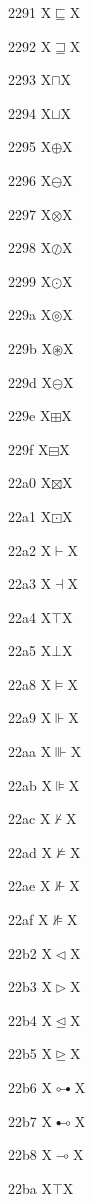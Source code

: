 \documentclass[11pt]{article}
\begin{document}
2291 X{\ensuremath{\sqsubseteq}}X

2292 X{\ensuremath{\sqsupseteq}}X

2293 X{\ensuremath{\sqcap}}X

2294 X{\ensuremath{\sqcup}}X

2295 X{\ensuremath{\oplus}}X

2296 X{\ensuremath{\ominus}}X

2297 X{\ensuremath{\otimes}}X

2298 X{\ensuremath{\oslash}}X

2299 X{\ensuremath{\odot}}X

229a X{\ensuremath{\circledcirc}}X

229b X{\ensuremath{\circledast}}X

229d X{\ensuremath{\circleddash}}X

229e X{\ensuremath{\boxplus}}X

229f X{\ensuremath{\boxminus}}X

22a0 X{\ensuremath{\boxtimes}}X

22a1 X{\ensuremath{\boxdot}}X

22a2 X{\ensuremath{\vdash}}X

22a3 X{\ensuremath{\dashv}}X

22a4 X{\ensuremath{\top}}X

22a5 X{\ensuremath{\bot}}X

22a8 X{\ensuremath{\vDash}}X

22a9 X{\ensuremath{\Vdash}}X

22aa X{\ensuremath{\Vvdash}}X

22ab X{\ensuremath{\VDash}}X

22ac X{\ensuremath{\nvdash}}X

22ad X{\ensuremath{\nvDash}}X

22ae X{\ensuremath{\nVdash}}X

22af X{\ensuremath{\nVDash}}X

22b2 X{\ensuremath{\vartriangleleft}}X

22b3 X{\ensuremath{\vartriangleright}}X

22b4 X{\ensuremath{\trianglelefteq}}X

22b5 X{\ensuremath{\trianglerighteq}}X

22b6 X{\ensuremath{\multimapdotbothA}}X

22b7 X{\ensuremath{\multimapdotbothB}}X

22b8 X{\ensuremath{\multimap}}X

22ba X{\ensuremath{\intercal}}X
\end{document}
